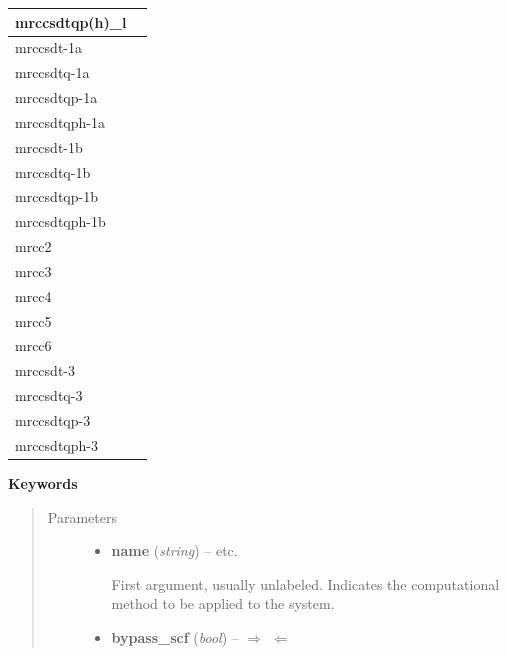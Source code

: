 \documentclass[letterpaper,10pt,english]{sphinxmanual}
\begin{document}
\begin{fulllineitems}
\begin{longtable}{|l|l|}
mrccsdtqp(h)\_l
 & \\\hline

mrccsdt-1a
 & \\\hline

mrccsdtq-1a
 & \\\hline

mrccsdtqp-1a
 & \\\hline

mrccsdtqph-1a
 & \\\hline

mrccsdt-1b
 & \\\hline

mrccsdtq-1b
 & \\\hline

mrccsdtqp-1b
 & \\\hline

mrccsdtqph-1b
 & \\\hline

mrcc2
 & \\\hline

mrcc3
 & \\\hline

mrcc4
 & \\\hline

mrcc5
 & \\\hline

mrcc6
 & \\\hline

mrccsdt-3
 & \\\hline

mrccsdtq-3
 & \\\hline

mrccsdtqp-3
 & \\\hline

mrccsdtqph-3
 & \\\hline
\end{longtable}


\textbf{Keywords}
\begin{quote}\begin{description}
\item[{Parameters}] \leavevmode\begin{itemize}
\item {} 
\textbf{name} (\emph{string}) -- 
 \textbar{}\textbar{}  \textbar{}\textbar{}  \textbar{}\textbar{} etc.

First argument, usually unlabeled. Indicates the computational method
to be applied to the system.


\item {} 
\textbf{bypass\_scf} (\emph{bool}) -- 
 \textbar{}\textbar{} $\Rightarrow$  $\Leftarrow$


\end{itemize}
\end{description}
\end{quote}
\end{fulllineitems}
\end{document}
